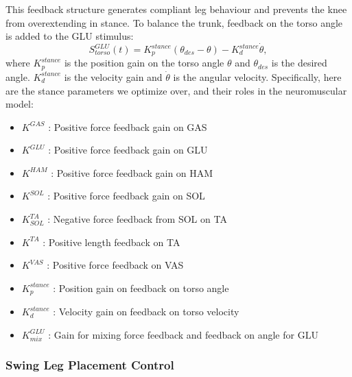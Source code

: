 This feedback structure generates compliant leg behaviour and prevents the knee from overextending in stance. To balance the trunk, feedback on the torso angle is added to the GLU stimulus:
\begin{equation*}
S^{GLU}_{torso}(t) = K_p^{stance}(\theta_{des} - \theta) -K_d^{stance}\dot{\theta},
\end{equation*}
where $K_p^{stance}$ is the position gain on the torso angle $\theta$ and $\theta_{des}$ is the desired angle. $K_d^{stance}$ is the velocity gain and $\dot{\theta}$ is the angular velocity.
Specifically, here are the stance parameters we optimize over, and their roles in the neuromuscular model:
 
\begin{itemize}
\item $K^{GAS}$ : Positive force feedback gain on GAS
\vspace{-2mm}
\item $K^{GLU}$ : Positive force feedback gain on GLU
\vspace{-2mm}
\item $K^{HAM}$ : Positive force feedback gain on HAM
\vspace{-2mm}
\item $K^{SOL}$ : Positive force feedback gain on SOL
\vspace{-2mm}
\item $K^{TA}_{SOL}$ : Negative force feedback from SOL on TA
\vspace{-2mm}
\item $K^{TA}$ : Positive length feedback on TA
\vspace{-2mm}
\item $K^{VAS}$ : Positive force feedback on VAS
\vspace{-2mm}
\item $K^{stance}_p$ : Position gain on feedback on torso angle
\vspace{-2mm}
\item $K^{stance}_d$ : Velocity gain on feedback on torso velocity
\vspace{-2mm}
\item $K_{mix}^{GLU}$ : Gain for mixing force feedback and feedback on angle for GLU
\end{itemize}

\subsubsection{Swing Leg Placement Control}

